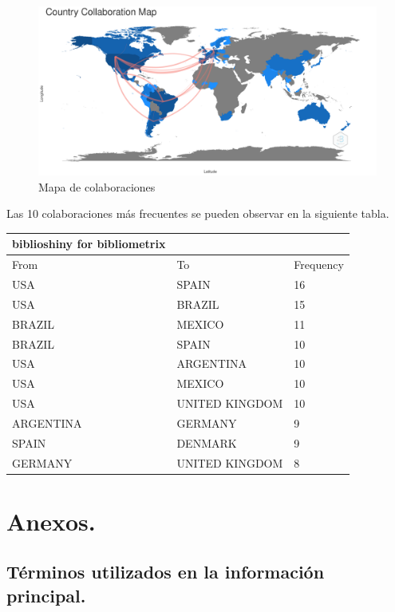 \documentclass[
]{article}
\begin{document}
\begin{figure}
\centering
\includegraphics{CountryCollaborationMap-2022-01-05.png}
\caption{Mapa de colaboraciones}
\end{figure}

Las 10 colaboraciones más frecuentes se pueden observar en la siguiente
tabla.

\begin{longtable}[]{@{}lll@{}}
\toprule
biblioshiny for bibliometrix & & \\
\midrule
\endhead
From & To & Frequency \\
USA & SPAIN & 16 \\
USA & BRAZIL & 15 \\
BRAZIL & MEXICO & 11 \\
BRAZIL & SPAIN & 10 \\
USA & ARGENTINA & 10 \\
USA & MEXICO & 10 \\
USA & UNITED KINGDOM & 10 \\
ARGENTINA & GERMANY & 9 \\
SPAIN & DENMARK & 9 \\
GERMANY & UNITED KINGDOM & 8 \\
\bottomrule
\end{longtable}

\hypertarget{anexos.}{%
\section{Anexos.}\label{anexos.}}

\hypertarget{tuxe9rminos-utilizados-en-la-informaciuxf3n-principal.}{%
\subsection{Términos utilizados en la información
principal.}\label{tuxe9rminos-utilizados-en-la-informaciuxf3n-principal.}}
\end{document}
